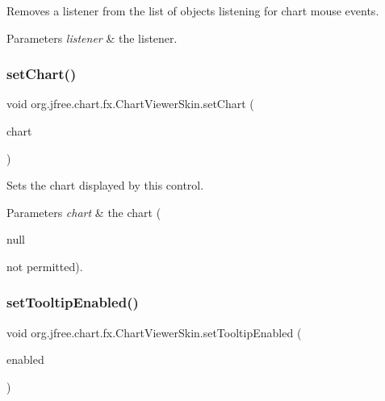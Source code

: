 Removes a listener from the list of objects listening for chart mouse events.


\begin{DoxyParams}{Parameters}
{\em listener} & the listener. \\
\hline
\end{DoxyParams}
\mbox{\label{classorg_1_1jfree_1_1chart_1_1fx_1_1_chart_viewer_skin_a12ed36a468c16c40d539492c12d5c21d}} 
\subsubsection{\texorpdfstring{set\+Chart()}{setChart()}}
{\footnotesize\ttfamily void org.\+jfree.\+chart.\+fx.\+Chart\+Viewer\+Skin.\+set\+Chart (\begin{DoxyParamCaption}\item[{\mbox{\hyperlink{classorg_1_1jfree_1_1chart_1_1_j_free_chart}{J\+Free\+Chart}}}]{chart }\end{DoxyParamCaption})}

Sets the chart displayed by this control.


\begin{DoxyParams}{Parameters}
{\em chart} & the chart (
\begin{DoxyCode}
null 
\end{DoxyCode}
 not permitted). \\
\hline
\end{DoxyParams}
\mbox{\label{classorg_1_1jfree_1_1chart_1_1fx_1_1_chart_viewer_skin_a2bf0dfe48c946544b7d81141125f5c04}} 
\subsubsection{\texorpdfstring{set\+Tooltip\+Enabled()}{setTooltipEnabled()}}
{\footnotesize\ttfamily void org.\+jfree.\+chart.\+fx.\+Chart\+Viewer\+Skin.\+set\+Tooltip\+Enabled (\begin{DoxyParamCaption}\item[{boolean}]{enabled }\end{DoxyParamCaption})}

